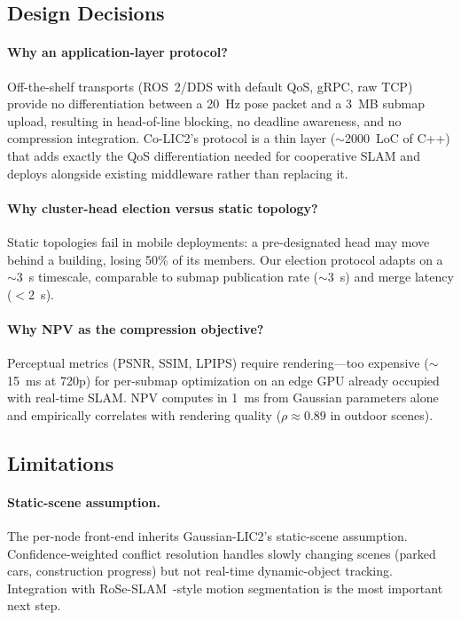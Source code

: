 \label{sec:discussion}

\subsection{Design Decisions}

\paragraph{Why an application-layer protocol?} Off-the-shelf transports
(ROS~2/DDS with default QoS, gRPC, raw TCP) provide no differentiation
between a 20~Hz pose packet and a 3~MB submap upload, resulting in
head-of-line blocking, no deadline awareness, and no compression integration.
Co-LIC2's protocol is a thin layer ($\sim$2000~LoC of C++) that adds
exactly the QoS differentiation needed for cooperative SLAM and deploys
alongside existing middleware rather than replacing it.

\paragraph{Why cluster-head election versus static topology?} Static
topologies fail in mobile deployments: a pre-designated head may move
behind a building, losing 50\% of its members. Our election protocol adapts
on a $\sim$3~s timescale, comparable to submap publication rate ($\sim$3~s)
and merge latency ($<$2~s).

\paragraph{Why NPV as the compression objective?} Perceptual metrics (PSNR,
SSIM, LPIPS) require rendering---too expensive ($\sim$15~ms at 720p) for
per-submap optimization on an edge GPU already occupied with real-time
SLAM. NPV computes in 1~ms from Gaussian parameters alone and empirically
correlates with rendering quality ($\rho\approx 0.89$ in outdoor scenes).

\subsection{Limitations}

\paragraph{Static-scene assumption.} The per-node front-end inherits
Gaussian-LIC2's static-scene assumption. Confidence-weighted conflict
resolution handles slowly changing scenes (parked cars, construction
progress) but not real-time dynamic-object tracking. Integration with
RoSe-SLAM~\cite{wang2026roseslam}-style motion segmentation is the most
important next step.

